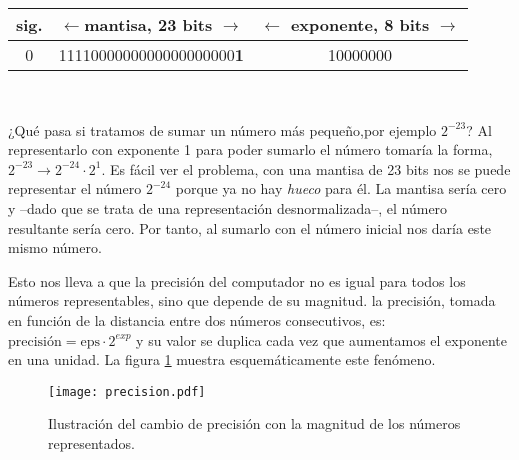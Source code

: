\begin{tabular}{|c||c||c|}
\hline
sig.&$\leftarrow$mantisa, 23 bits $\rightarrow$&$\leftarrow$ exponente, 8 bits $\rightarrow$\\
\hline
0&1111000000000000000000\textbf{1}&10000000\\
\hline
\end{tabular}\\

\begin{paracol}{2}
¿Qué pasa si tratamos de sumar un número más pequeño,por ejemplo $2^{-23}$? Al representarlo con exponente 1 para poder sumarlo el número tomaría la forma, $2^{-23}\rightarrow 2^{-24}\cdot2^{1}$. Es fácil ver el problema, con una mantisa de 23 bits nos se puede representar el número $2^{-24}$ porque ya no hay \emph{hueco} para él. La mantisa sería cero y --dado que se trata de una representación desnormalizada--, el número resultante sería cero. Por tanto, al sumarlo con el número inicial nos daría este mismo número.

Esto nos lleva a que la precisión del computador no es igual para todos los números representables, sino que depende de su magnitud. la precisión, tomada en función de la distancia entre dos números consecutivos, es: $\text{precisión}=\text{eps}\cdot 2^{exp}$ y su valor se duplica cada vez que aumentamos el exponente en una unidad. La figura \ref{fig:precision} muestra esquemáticamente este fenómeno.
\end{paracol}

\begin{figure}[h]
	\centering
		\texttt{[image: precision.pdf]}
	\caption{Ilustración del cambio de precisión con la magnitud de los números representados.}
	\label{fig:precision}
\end{figure}

